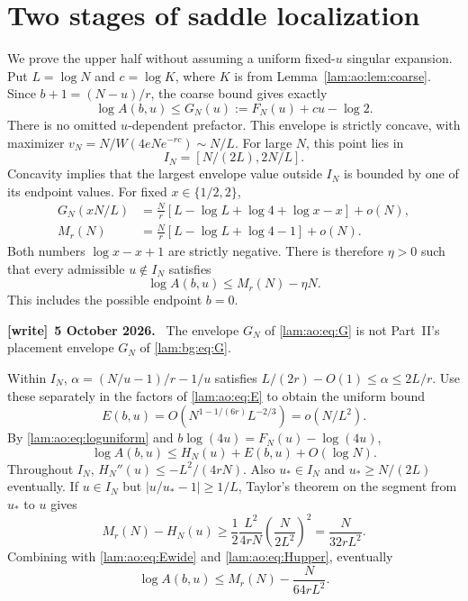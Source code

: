 \documentclass[11pt,a4paper]{article}
\numberwithin{equation}{section}
\theoremstyle{remark}
\newenvironment{writenote}[1][]{\par\smallskip\begingroup\small
 \noindent\textbf{[write]}\if\relax\detokenize{#1}\relax\else~\textbf{#1.}\fi\ }%
 {\par\endgroup\smallskip}
\begin{document}
\section{Two stages of saddle localization}\label{lam:ao:sec:localization}
We prove the upper half without assuming a uniform fixed-$u$ singular expansion. Put $L=\log N$ and $c=\log K$, where $K$ is from Lemma~\ref{lam:ao:lem:coarse}. Since $b+1=(N-u)/r$, the coarse bound gives exactly
\begin{equation}\label{lam:ao:eq:G}
 \log A(b,u)\le G_N(u):=F_N(u)+cu-\log2.
\end{equation}
There is no omitted $u$-dependent prefactor. This envelope is strictly concave, with maximizer $v_N=N/W(4eNe^{-rc})\sim N/L$. For large $N$, this point lies in
\[
 I_N=[N/(2L),2N/L].
\]
Concavity implies that the largest envelope value outside $I_N$ is bounded by one of its endpoint values. For fixed $x\in\{1/2,2\}$,
\begin{align*}
 G_N(xN/L)&=\frac Nr[L-\log L+\log4+\log x-x]+o(N),\\
 M_r(N)&=\frac Nr[L-\log L+\log4-1]+o(N).
\end{align*}
Both numbers $\log x-x+1$ are strictly negative. There is therefore $\eta>0$ such that every admissible $u\notin I_N$ satisfies
\begin{equation}\label{lam:ao:eq:outer}
 \log A(b,u)\le M_r(N)-\eta N.
\end{equation}
This includes the possible endpoint $b=0$.
\begin{writenote}[5 October 2026]
The envelope $G_N$ of \eqref{lam:ao:eq:G} is not Part~II's placement envelope $G_N$ of \eqref{lam:bg:eq:G}.
\end{writenote}

Within $I_N$, $\alpha=(N/u-1)/r-1/u$ satisfies $L/(2r)-O(1)\le\alpha\le2L/r$. Use these separately in the factors of \eqref{lam:ao:eq:E} to obtain the uniform bound
\begin{equation}\label{lam:ao:eq:Ewide}
 E(b,u)=O(N^{1-1/(6r)}L^{-2/3})=o(N/L^2).
\end{equation}
By \eqref{lam:ao:eq:loguniform} and $b\log(4u)=F_N(u)-\log(4u)$,
\begin{equation}\label{lam:ao:eq:Hupper}
 \log A(b,u)\le H_N(u)+E(b,u)+O(\log N).
\end{equation}
Throughout $I_N$, $H_N''(u)\le-L^2/(4rN)$. Also $u_*\in I_N$ and $u_*\ge N/(2L)$ eventually. If $u\in I_N$ but $|u/u_*-1|\ge1/L$, Taylor's theorem on the segment from $u_*$ to $u$ gives
\[
 M_r(N)-H_N(u)\ge\frac12\frac{L^2}{4rN}\left(\frac{N}{2L^2}\right)^2
                  =\frac{N}{32rL^2}.
\]
Combining with \eqref{lam:ao:eq:Ewide} and \eqref{lam:ao:eq:Hupper}, eventually
\begin{equation}\label{lam:ao:eq:middle}
 \log A(b,u)\le M_r(N)-\frac{N}{64rL^2}.
\end{equation}
\end{document}
